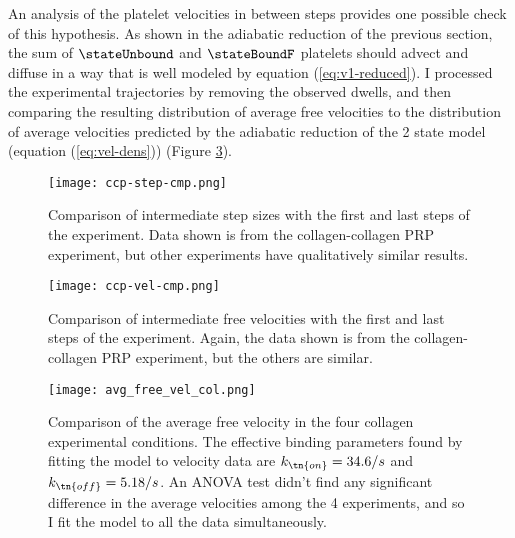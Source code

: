 An analysis of the platelet velocities in between steps provides one
possible check of this hypothesis. As shown in the adiabatic reduction
of the previous section, the sum of $\stateUnbound$ and $\stateBoundF$
platelets should advect and diffuse in a way that is well modeled by
equation (\ref{eq:v1-reduced}). I processed the experimental
trajectories by removing the observed dwells, and then comparing the
resulting distribution of average free velocities to the distribution of
average velocities predicted by the adiabatic reduction of the 2 state
model (equation (\ref{eq:vel-dens})) (Figure \ref{fig:avg-free-vel-col}).

\begin{figure}
  \centering
  \texttt{[image: ccp-step-cmp.png]}
  \caption{Comparison of intermediate step sizes with the first and
    last steps of the experiment. Data shown is from the
    collagen-collagen PRP experiment, but other experiments have
    qualitatively similar results.}
  \label{fig:ccp-step-cmp}
\end{figure}

\begin{figure}
  \centering
  \texttt{[image: ccp-vel-cmp.png]}
  \caption{Comparison of intermediate free velocities with the first
    and last steps of the experiment. Again, the data shown is from
    the collagen-collagen PRP experiment, but the others are similar.}
  \label{fig:ccp-vel-cmp}
\end{figure}

\begin{figure}
  \centering
  \texttt{[image: avg\_free\_vel\_col.png]}
  \caption{Comparison of the average free velocity in the four collagen
    experimental conditions. The effective binding parameters found by
    fitting the model to velocity data are $k_\tn{on}=34.6/s$ and
    $k_\tn{off} = 5.18/s$. An ANOVA test didn't find any significant
    difference in the average velocities among the 4 experiments, and so
    I fit the model to all the data simultaneously.}
  \label{fig:avg-free-vel-col}
\end{figure}

